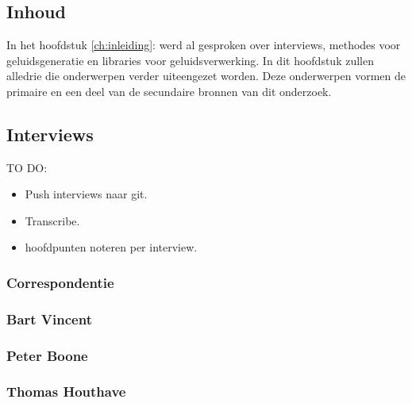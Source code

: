 \chapter{}
\label{ch:stand-van-zaken}



\section{Inhoud}

In het hoofdstuk \ref{ch:inleiding}:  werd al gesproken over interviews, methodes voor geluidsgeneratie en libraries voor geluidsverwerking. In dit hoofdstuk zullen alledrie die onderwerpen verder uiteengezet worden. Deze onderwerpen vormen de primaire en een deel van de secundaire bronnen van dit onderzoek.

\section{Interviews}

TO DO:
\begin{itemize}
    \item Push interviews naar git.
    \item Transcribe.
    \item hoofdpunten noteren per interview.
\end{itemize}{}

\subsection{Correspondentie}

\subsection{Bart Vincent}

\subsection{Peter Boone}

\subsection{Thomas Houthave}

